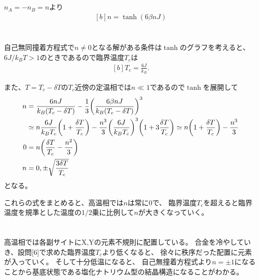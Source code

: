 \documentclass[../ap_2008.tex]{subfiles}
\begin{document}
\section{}
\(n_A = -n_B = n\)より
\begin{equation}\begin{aligned}[b]
    n = \tanh(6\beta nJ)
\end{aligned}\end{equation}

\section{}
自己無同撞着方程式で\(n\neq0\)となる解がある条件は\(\tanh\)のグラフを考えると、
\(6J/k_BT>1\)のときであるので臨界温度\(T_c\)は
\begin{equation}\begin{aligned}[b]
    T_c = \frac{6J}{k_B}.
\end{aligned}\end{equation}

また、\(T = T_c-\delta T\)の\(T_c\)近傍の定温相では\(n\ll 1\)であるので\(\tanh\)を展開して
\begin{equation}\begin{aligned}[b]
    n &= \frac{6nJ}{k_B(T_c-\delta T)} -\frac{1}{3}\qty(\frac{6\beta nJ}{k_B(T_c-\delta T)})^3\\
    &\simeq n\frac{6J}{k_BT_c}\qty(1+\frac{\delta T}{T_c})-\frac{n^3}{3}\qty(\frac{6J}{k_BT_c})^3\qty(1+3\frac{\delta T}{T_c})
    \simeq n\qty(1+\frac{\delta T}{T_c})-\frac{n^3}{3}\\
    0 &= n\qty(\frac{\delta T}{T_c}-\frac{n^2}{3})\\
    n &= 0, \pm\sqrt{\frac{3\delta T}{T_c}}
\end{aligned}\end{equation}
となる。

これらの式をまとめると、高温相では\(n\)は常に\(0\)で、
臨界温度\(T_c\)を超えると臨界温度を規準とした温度の\(1/2\)乗に比例して\(n\)が大きくなっていく。

\section{}
高温相では各副サイトにX,Yの元素不規則に配置している。
合金を冷やしていき、設問[6]で求めた臨界温度\(T_c\)より低くなると、
徐々に秩序だった配置に元素が入っていく。
そして十分低温になると、
自己無撞着方程式より\(n=\pm 1\)になることから基底状態である塩化ナトリウム型の結晶構造になることがわかる。
\end{document}
